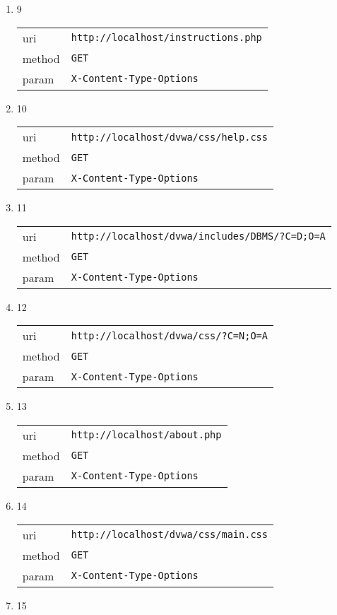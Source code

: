 \documentclass[10pt]{article}
\begin{document}
\begin{itemize}
\begin{enumerate}
\begin{tabular}{| l | p{12cm}}
\end{tabular}
\item[] 9
\begin{tabular}{| l | p{12cm}}
uri & \texttt{http://localhost/instructions.php} \\
method & \texttt{GET} \\
param & \texttt{X-Content-Type-Options} \\
\end{tabular}
\item[] 10
\begin{tabular}{| l | p{12cm}}
uri & \texttt{http://localhost/dvwa/css/help.css} \\
method & \texttt{GET} \\
param & \texttt{X-Content-Type-Options} \\
\end{tabular}
\item[] 11
\begin{tabular}{| l | p{12cm}}
uri & \texttt{http://localhost/dvwa/includes/DBMS/?C=D;O=A} \\
method & \texttt{GET} \\
param & \texttt{X-Content-Type-Options} \\
\end{tabular}
\item[] 12
\begin{tabular}{| l | p{12cm}}
uri & \texttt{http://localhost/dvwa/css/?C=N;O=A} \\
method & \texttt{GET} \\
param & \texttt{X-Content-Type-Options} \\
\end{tabular}
\item[] 13
\begin{tabular}{| l | p{12cm}}
uri & \texttt{http://localhost/about.php} \\
method & \texttt{GET} \\
param & \texttt{X-Content-Type-Options} \\
\end{tabular}
\item[] 14
\begin{tabular}{| l | p{12cm}}
uri & \texttt{http://localhost/dvwa/css/main.css} \\
method & \texttt{GET} \\
param & \texttt{X-Content-Type-Options} \\
\end{tabular}
\item[] 15

\end{enumerate}
\end{itemize}
\end{document}
